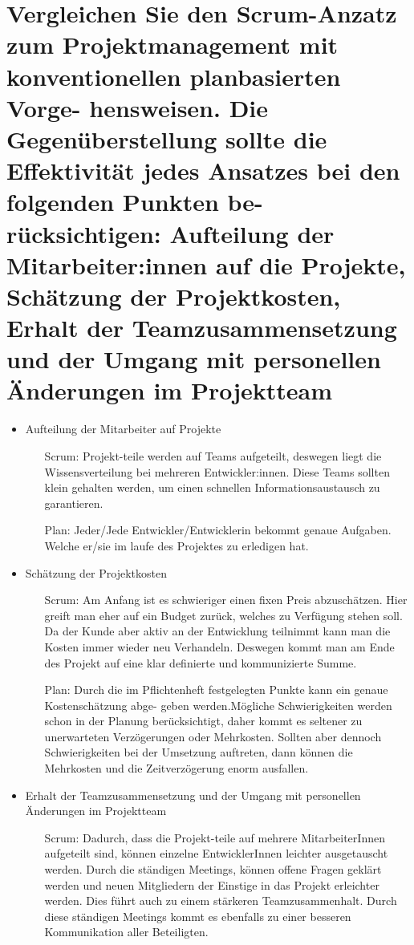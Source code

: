 \documentclass[12pt]{article}
\begin{document}
\section{Vergleichen Sie den Scrum-Anzatz zum Projektmanagement mit konventionellen planbasierten Vorge-
hensweisen. Die Gegenüberstellung sollte die Effektivität jedes Ansatzes bei den folgenden Punkten be-
rücksichtigen: Aufteilung der Mitarbeiter:innen auf die Projekte, Schätzung der Projektkosten, Erhalt der
Teamzusammensetzung und der Umgang mit personellen Änderungen im Projektteam}
\begin{itemize}
 \item Aufteilung der Mitarbeiter auf Projekte
 \begin{itemize}
  \item [Scrum:] Projekt-teile werden auf Teams aufgeteilt, deswegen liegt die Wissensverteilung bei mehreren Entwickler:innen. Diese Teams sollten klein gehalten werden, um einen schnellen Informationsaustausch zu garantieren.
  \item[Plan:] Jeder/Jede Entwickler/Entwicklerin bekommt genaue Aufgaben. Welche er/sie im laufe des Projektes zu erledigen hat.
 \end{itemize}
 \item Schätzung der Projektkosten
 \begin{itemize}
  \item [Scrum:] Am Anfang ist es schwieriger einen fixen Preis abzuschätzen. Hier greift man eher auf ein Budget zurück, welches zu Verfügung stehen soll. Da der Kunde aber aktiv an der Entwicklung teilnimmt kann man die Kosten immer wieder neu Verhandeln. Deswegen kommt man am Ende des Projekt auf eine klar definierte und kommunizierte Summe.
  \item [Plan:] Durch die im Pflichtenheft festgelegten Punkte kann ein genaue Kostenschätzung abge- geben werden.Mögliche Schwierigkeiten werden schon in der Planung berücksichtigt, daher kommt es seltener zu unerwarteten Verzögerungen oder Mehrkosten. Sollten aber dennoch Schwierigkeiten bei der Umsetzung auftreten, dann können die Mehrkosten und die Zeitverzögerung enorm ausfallen.
 \end{itemize}
 \item Erhalt der Teamzusammensetzung und der Umgang mit personellen Änderungen im Projektteam
 \begin{itemize}
  \item [Scrum:] Dadurch, dass die Projekt-teile auf mehrere MitarbeiterInnen aufgeteilt sind, können einzelne EntwicklerInnen leichter ausgetauscht werden. Durch die ständigen Meetings, können offene Fragen geklärt werden und neuen Mitgliedern der Einstige in das Projekt erleichter werden. Dies führt auch zu einem stärkeren Teamzusammenhalt. Durch diese ständigen Meetings kommt es ebenfalls zu einer besseren Kommunikation aller Beteiligten.

\end{itemize}
\end{itemize}
\end{document}
